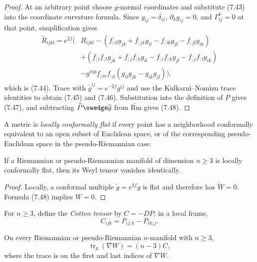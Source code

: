 \begin{proof}
\sketch
At an arbitrary point choose $g$-normal coordinates and substitute (7.43)
into the coordinate curvature formula.  Since
$g_{ij}=\delta_{ij}$, $\partial_kg_{ij}=0$, and $\Gamma^k_{ij}=0$ at that
point, simplification gives
\begin{align*}
\widetilde R_{ijkl}=e^{2f}\bigl(&R_{ijkl}
-(f_{;il}g_{jk}+f_{;jk}g_{il}-f_{;ik}g_{jl}-f_{;jl}g_{ik})\\
&+(f_{;i}f_{;l}g_{jk}+f_{;j}f_{;k}g_{il}
-f_{;i}f_{;k}g_{jl}-f_{;j}f_{;l}g_{ik})\\
&-g^{mp}f_{;m}f_{;p}(g_{il}g_{jk}-g_{ik}g_{jl})\bigr),
\end{align*}
which is (7.44).  Trace with
$\widetilde g^{ij}=e^{-2f}g^{ij}$ and use the Kulkarni--Nomizu trace
identities to obtain (7.45) and (7.46).  Substitution into the definition of
$P$ gives (7.47), and subtracting
$\widetilde P\owedge\widetilde g$ from $\widetilde{\mathrm{Rm}}$ gives (7.48).
\end{proof}

A metric is \emph{locally conformally flat} if every point has a neighborhood
conformally equivalent to an open subset of Euclidean space, or of the
corresponding pseudo-Euclidean space in the pseudo-Riemannian case.

\begin{corollary}
\label{cor:weyl-zero-locally-conformally-flat}

If a Riemannian or pseudo-Riemannian manifold of dimension $n\geq3$ is locally
conformally flat, then its Weyl tensor vanishes identically.
\end{corollary}

\begin{proof}
\sketch
Locally, a conformal multiple $\widetilde g=e^{2f}g$ is flat and therefore has
$\widetilde W=0$.  Formula (7.48) implies $W=0$.
\end{proof}

For $n\geq3$, define the \emph{Cotton tensor} by $C=-DP$; in a local frame,
\begin{equation}
C_{ijk}=P_{ij;k}-P_{ik;j}. \tag{7.49}
\end{equation}

\begin{proposition}
\label{prop:trace-covariant-derivative-weyl}

On every Riemannian or pseudo-Riemannian $n$-manifold with $n\geq3$,
\begin{equation}
\operatorname{tr}_g(\nabla W)=(n-3)C, \tag{7.50}
\end{equation}
where the trace is on the first and last indices of $\nabla W$.
\end{proposition}

